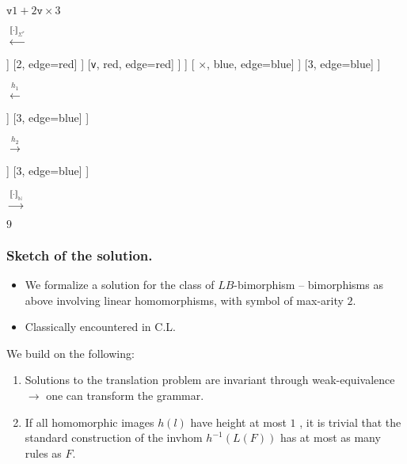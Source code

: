 \documentclass{beamer}
\begin{document}
\begin{frame}
\begin{center}
      \fontsize{6}{7}      
      \begin{minipage}{0.1\linewidth}
        $\texttt{v} 1 + 2\texttt{v} \times 3$
      \end{minipage}
    $\xleftarrow{\llbracket \cdot \rrbracket_{\Sigma^{\ast}}}$
    \begin{minipage}{0.18\linewidth}
	      \centering
	      \begin{forest}
      	      [$\cdot$, blue [$\cdot$, blue, edge=blue [ $\cdot$, red, edge=blue [ \texttt{v}, red, edge=red ] [$\cdot$, red, edge=red [$\cdot$, red, edge=red [$\cdot$, red, edge=red [1, edge=red] [+, red, edge=red]] [2, edge=red] ] [\texttt{v}, red, edge=red] ]  ] [ $\times$, blue, edge=blue] ] [3, edge=blue] ]
           \end{forest}
      \end{minipage}
      $\xleftarrow{h_1}$      
	  \begin{minipage}{0.1\linewidth}
		  \centering
		  \begin{forest}
		    [$r_{m}$, blue [ $r_{a}$, red, edge=blue [$1$, edge=red] [$2$, edge=red] ] [$3$, edge=blue] ] 
		  \end{forest}
	  \end{minipage}
      $\xrightarrow{h_2}$
      \begin{minipage}{0.18\linewidth}
      	\centering
      	\begin{forest}
      		[\texttt{mul}, blue [ \texttt{add},red, edge=blue [$1$, edge=red] [$2$, edge=red] ]  [$3$, edge=blue] ]
      	\end{forest}
      \end{minipage}
      $\xrightarrow{\llbracket \cdot \rrbracket_{\mathbb{N}}}$
      \begin{minipage}{0.05\linewidth}
      	\centering
      	$9$
      \end{minipage}
    \end{center}
\end{frame}

\begin{frame}
  \frametitle{Sketch of the solution.}
  \begin{itemize}
  \item We formalize a solution for the class of $LB$-bimorphism -- bimorphisms as above involving linear homomorphisms, with symbol of max-arity $2$.
  \item Classically encountered in C.L.
  \end{itemize}

  
  We build on the following:
  \begin{enumerate}
  \item Solutions to the translation problem are invariant through weak-equivalence $\rightarrow$ one can transform the grammar.
  \item If all homomorphic images $h(l)$ have height at most $1$ , it is trivial that the standard construction of the invhom $h^{-1}(L(F))$ has at most as many rules as $F$.
  \end{enumerate}
\end{frame}
\end{document}
